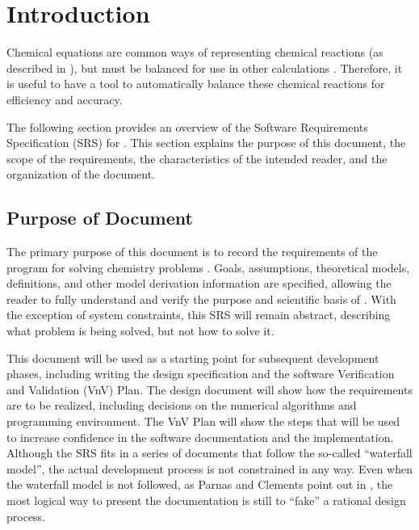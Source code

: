 \documentclass[12pt]{article}
\begin{document}
  
\newpage



\section{Introduction} \label{sec_intro}
Chemical equations are common ways of representing chemical reactions (as
described in ), but must be balanced for use in other
calculations \cite{lund_introduction_2023}. Therefore, it is useful to have a
tool to automatically balance these chemical reactions for efficiency and
accuracy.

The following section provides an overview of the Software Requirements
Specification (SRS) for \progname{}. This section explains the purpose of this
document, the scope of the requirements, the characteristics of the intended
reader, and the organization of the document.

\subsection{Purpose of Document}
  
The primary purpose of this document is to record the requirements of the
program for solving chemistry problems .
Goals, assumptions, theoretical models,
definitions, and other model derivation information are specified, allowing the
reader to fully understand and verify the purpose and scientific basis of
\progname{}. With the exception of system constraints, this SRS will remain
abstract, describing what problem is being solved, but not how to solve it.

This document will be used as a starting point for subsequent development
phases, including writing the design specification and the software Verification
and Validation (VnV) Plan. The design document will show how the requirements
are to be realized, including decisions on the numerical algorithms and
programming environment. The VnV Plan will show the steps that will be used to
increase confidence in the software documentation and the implementation.
Although the SRS fits in a series of documents that follow the so-called
``waterfall model'', the actual development process is not constrained in any
way. Even when the waterfall model is not followed, as Parnas and Clements point
out in \cite{ParnasAndClements1986}, the most logical way to present the
documentation is still to ``fake'' a rational design process.
\end{document}
